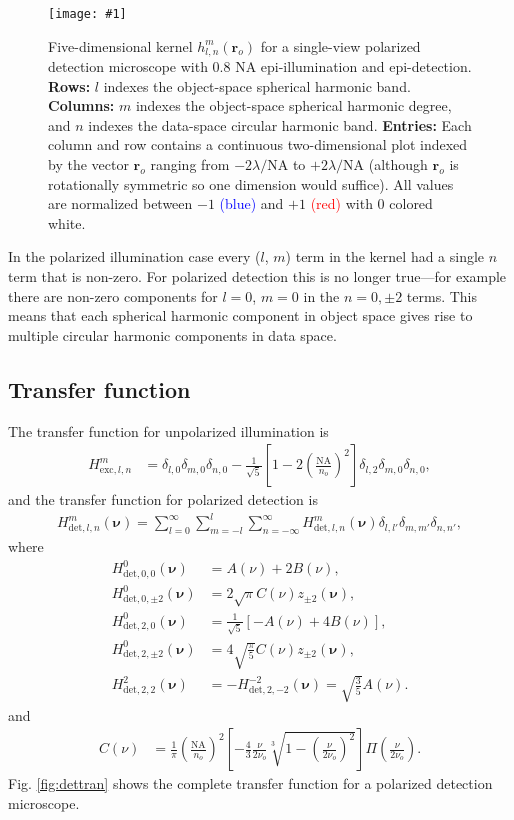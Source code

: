 \documentclass[11pt]{article}
\providecommand{\ro}[1]{\mathbf{\mathbf{r}}_o}
\providecommand{\bs}[1]{\boldsymbol{#1}}
\providecommand{\fig}[4]{
\begin{figure}[h]
 \captionsetup{width=1.0\linewidth}
 \centering
 \texttt{[image: \#1]}
 \caption{#3}
 \label{fig:#4}
\end{figure}
}
\begin{document}
\fig{../calculations/out/hhdet.pdf}{1.0}{Five-dimensional kernel
  $h_{l,n}^m(\ro{})$ for a single-view polarized detection microscope with
  0.8 NA epi-illumination and epi-detection. \textbf{Rows:} $l$ indexes the
  object-space spherical harmonic band. \textbf{Columns:} $m$ indexes the
  object-space spherical harmonic degree, and $n$ indexes the data-space
  circular harmonic band. \textbf{Entries:} Each column and row contains a
  continuous two-dimensional plot indexed by the vector $\ro{}$ ranging from
  $-2\lambda/\text{NA}$ to $+2\lambda/\text{NA}$ (although $\ro{}$ is
  rotationally symmetric so one dimension would suffice). All values are
  normalized between $-1$ \textcolor{blue}{(blue)} and $+1$
  \textcolor{red}{(red)} with $0$ colored white.}{detkern}

In the polarized illumination case every ($l$, $m$) term in the kernel had a
single $n$ term that is non-zero. For polarized detection this is no longer
true---for example there are non-zero components for $l=0$, $m=0$ in the
$n=0, \pm 2$ terms. This means that each spherical harmonic component in object
space gives rise to multiple circular harmonic components in data space.

\subsection{Transfer function}
The transfer function for unpolarized illumination is
\begin{align}
  H^m_{\text{exc}, l,n} &= \delta_{l,0}\delta_{m,0}\delta_{n,0} - \frac{1}{\sqrt{5}}\left[1 - 2\left(\frac{\text{NA}}{n_o}\right)^2\right]\delta_{l,2}\delta_{m,0}\delta_{n,0},
\end{align}
and the transfer function for polarized detection is
\begin{align}
  H_{\text{det},l,n}^m(\bs{\nu}) = \sum_{l=0}^{\infty}\sum_{m=-l}^l\sum_{n=-\infty}^{\infty} H_{\text{det},l,n}^m(\bs{\nu})\delta_{l,l'}\delta_{m,m'}\delta_{n,n'}, 
\end{align}
where
\begin{align}
  H_{\text{det},0,0}^0(\bs{\nu}) &= A(\nu) + 2B(\nu),\\
  H_{\text{det},0,\pm 2}^0(\bs{\nu}) &= 2\sqrt{\pi} C(\nu)z_{\pm 2}(\bs{\nu}),\\
  H_{\text{det},2,0}^0(\bs{\nu}) &= \frac{1}{\sqrt{5}}\left[-A(\nu) + 4B(\nu)\right],\\
  H_{\text{det},2,\pm 2}^0(\bs{\nu}) &= 4\sqrt{\frac{\pi}{5}}C(\nu)z_{\pm 2}(\bs{\nu}),\\
  H_{\text{det},2,2}^2(\bs{\nu}) &= -H_{\text{det},2,-2}^{-2}(\bs{\nu}) = \sqrt{\frac{3}{5}}A(\nu).
\end{align}
and
\begin{align}
  C(\nu) &= \frac{1}{\pi}\left(\frac{\text{NA}}{n_o}\right)^2\left[-\frac{4}{3}\frac{\nu}{2\nu_o}\sqrt[3]{1 - \left(\frac{\nu}{2\nu_o}\right)^2}\right]\Pi\left(\frac{\nu}{2\nu_o}\right).
\end{align}
Fig. \ref{fig:dettran} shows the complete transfer function for a polarized
detection microscope. 
\end{document}
